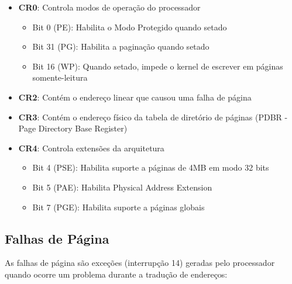 \begin{itemize}
    \item \textbf{CR0}: Controla modos de operação do processador
    \begin{itemize}
        \item Bit 0 (PE): Habilita o Modo Protegido quando setado
        \item Bit 31 (PG): Habilita a paginação quando setado
        \item Bit 16 (WP): Quando setado, impede o kernel de escrever em páginas somente-leitura
    \end{itemize}

    \item \textbf{CR2}: Contém o endereço linear que causou uma falha de página

    \item \textbf{CR3}: Contém o endereço físico da tabela de diretório de páginas (PDBR - Page Directory Base Register)

    \item \textbf{CR4}: Controla extensões da arquitetura
    \begin{itemize}
        \item Bit 4 (PSE): Habilita suporte a páginas de 4MB em modo 32 bits
        \item Bit 5 (PAE): Habilita Physical Address Extension
        \item Bit 7 (PGE): Habilita suporte a páginas globais
    \end{itemize}
\end{itemize}

\subsection{Falhas de Página}
\label{subsec:page_faults}

As falhas de página são exceções (interrupção 14) geradas pelo processador quando ocorre um problema durante a tradução de endereços:

